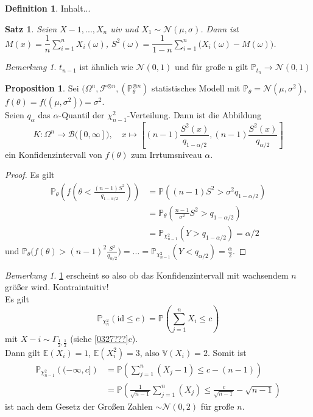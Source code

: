 \documentclass[10pt,a4paper]{article}
\newcommand{\al}{\ensuremath{\alpha}}
\newcommand{\Bor}{\mathscr B}
\newcommand{\Prb}{\mathbb P}
\newcommand{\Epv}{\ensuremath{\mathbb{E}}}
\newcommand{\Var}{\mathbb{V}}
\newcommand{\scF}{\ensuremath{\mathscr{F}}}
\newcommand{\Nv}{\mathscr N}
\theoremstyle{plain}
\newtheorem{satz}[theorem]{Satz}
\theoremstyle{definition}
\newtheorem{definition}[theorem]{Definition}
\newtheorem{prop}[theorem]{Proposition}
\theoremstyle{remark}
\newtheorem{bem}[theorem]{Bemerkung}
\newtheorem*{bem*}{Bemerkung}
\begin{document}
	\begin{definition}
		Inhalt...
	\end{definition}
	\begin{satz}
		Seien $X-1,...,X_n$ uiv und $X_1\sim\Nv(\mu,\sigma)$. Dann ist $M(x)=\dfrac{1}{n}\sum_{i=1}^{n}X_i(\omega)$, $S^2(\omega)=\dfrac{1}{1-n}\sum_{i=1}^{n}\big(X_i(\omega)-M(\omega)\big)$.
	\end{satz}

	\begin{bem*}
		$t_{n-1}$ ist ähnlich wie $\Nv(0,1)$ und für große n gilt $\Prb_{t_n}\to\Nv(0,1)$
	\end{bem*}

	\begin{prop}\label{0628prop}
		Sei $\big(\Omega^n,\scF^{\otimes n},(\Prb_\theta^{\otimes n})$ statistisches Modell mit $\Prb_\theta=\Nv(\mu,\sigma^2)$, $f(\theta)=f\big((\mu,\sigma^2)\big)=\sigma^2$.\\
		Seien $q_\al$ das $\al$-Quantil der $\chi^2_{n-1}$-Verteilung. Dann ist die Abbildung 
		\[K:\Omega^n\to\Bor\big([0,\infty]\big),\quad x\mapsto\left[(n-1)\frac{S^2(x)}{q_{1-\al/2}},(n-1)\frac{S^2(x)}{q_{\al/2}}\right]\]
		ein Konfidenzintervall von $f(\theta)$ zum Irrtumsniveau $\al$.
	\end{prop}
	\begin{proof}
		Es gilt
		\begin{align*}
		\Prb_\theta\left(f(\theta<\frac{(n-1)S^2}{q_{1-\al/2}})\right)&=\Prb\left((n-1)S^2>\sigma^2q_{1-\al/2}\right)\\
		&=\Prb_\theta\left(\frac{n-1}{\sigma^2}S^2>q_{1-\al/2}\right)\\
		&=\Prb_{\chi^2_{n-1}}\left(Y>q_{1-\al/2}\right)=\al/2
		\end{align*}
		und $\Prb_\theta\big(f(\theta)>(n-1)^2\frac{S^2}{q_{\al/2}}\big)=...=\Prb_{\chi_{n-1}^2}(Y<q_{\al/2})=\frac{\al}{2}$.
	\end{proof}

	\begin{bem}
		\ref{0628prop} erscheint so also ob das Konfidenzintervall mit wachsendem $n$ größer wird. Kontraintuitiv!\\
		Es gilt
		\[\Prb_{\chi_n^2}(\mathrm{id}\leq c)=\Prb\left(\sum_{j=1}^{n}X_i\leq c\right)\]
		mit $X-i\sim\Gamma_{\frac{1}{2},\frac{1}{2}}$ (siehe \ref{0327???}c).\\
		Dann gilt $\Epv(X_i)=1$, $\Epv(X_i^2)=3$, also $\Var(X_i)=2$. Somit ist
		\begin{align*}
		\Prb_{\chi_{n-1}^2}\left((-\infty,c]\right)&=\Prb\left(\sum_{j=1}^{n}(X_j-1)\leq c-(n-1)\right)\\
		&=\Prb\left(\frac{1}{\sqrt{n-1}}\sum_{j=1}^{n}(X_j)\leq\frac{c}{\sqrt{n-1}}-\sqrt{n-1}\right)
		\end{align*}
		ist nach dem Gesetz der Großen Zahlen $\sim\Nv(0,2)$ für große $n$.
	\end{bem}
\end{document}
